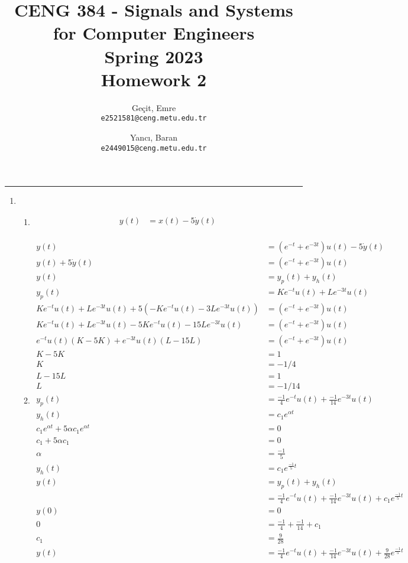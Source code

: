 \documentclass[10pt,a4paper, margin=1in]{article}
\author{
  Geçit, Emre\\
  \texttt{e2521581@ceng.metu.edu.tr}
  \and
  Yancı, Baran\\
  \texttt{e2449015@ceng.metu.edu.tr}
}
\title{CENG 384 - Signals and Systems for Computer Engineers \\
Spring 2023 \\
Homework 2}
\begin{document}
\maketitle



\noindent\rule{19cm}{1.2pt}

\begin{enumerate}

\item %
    \begin{enumerate}
    \item %
    \begin{align*}
        y(t) & = x(t) - 5 \dot{y}(t) \\
    \end{align*}
    \item %
    \begin{align*}
        y(t) & = (e^{-t} + e^{-3t})u(t) - 5 \dot{y}(t) \\
        y(t) + 5 \dot{y}(t) & = (e^{-t} + e^{-3t})u(t) \\
        y(t) & = y_p(t) + y_h(t) \\
        y_p(t) & = Ke^{-t}u(t) + Le^{-3t}u(t) \\
        Ke^{-t}u(t) + Le^{-3t}u(t) + 5 (-Ke^{-t}u(t) -3Le^{-3t}u(t)) & = (e^{-t} + e^{-3t})u(t) \\
        Ke^{-t}u(t) + Le^{-3t}u(t) - 5Ke^{-t}u(t) - 15Le^{-3t}u(t) & = (e^{-t} + e^{-3t})u(t) \\
        e^{-t}u(t) (K - 5K) + e^{-3t}u(t) (L - 15L) & = (e^{-t} + e^{-3t})u(t) \\
        K - 5K & = 1 \\
        K & = - 1/4 \\
        L - 15L & = 1 \\
        L & = - 1/14 \\
        y_p(t) & = \frac{-1}{4}e^{-t}u(t) + \frac{-1}{14}e^{-3t}u(t) \\
        y_h(t) & = c_1e^{\alpha t} \\
        c_1e^{\alpha t} + 5\alpha c_1e^{\alpha t} & = 0 \\
        c_1 + 5\alpha c_1 & = 0 \\
        \alpha & = \frac{-1}{5} \\
        y_h(t) & = c_1e^{\frac{-1}{5}t} \\
        y(t) & = y_p(t) + y_h(t) \\
        & = \frac{-1}{4}e^{-t}u(t) + \frac{-1}{14}e^{-3t}u(t) + c_1e^{\frac{-1}{5}t} \\
        y(0) & = 0 \\
        0 & = \frac{-1}{4} + \frac{-1}{14} + c_1 \\
        c_1 & = \frac{9}{28} \\
        y(t) & = \frac{-1}{4}e^{-t}u(t) + \frac{-1}{14}e^{-3t}u(t) + \frac{9}{28}e^{\frac{-1}{5}t} \\
    \end{align*}
    \end{enumerate}


\end{enumerate}
\end{document}
